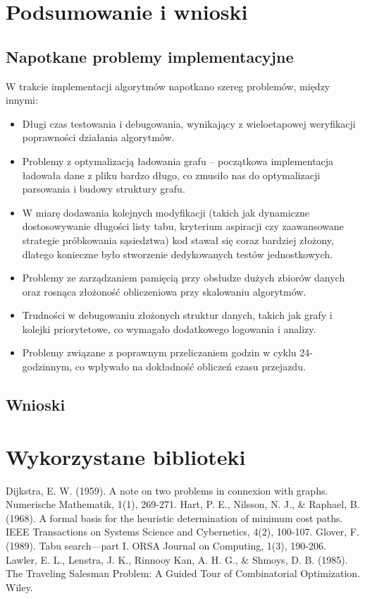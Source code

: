 \documentclass[12pt,a4paper]{article}
\begin{document}
\section{Podsumowanie i wnioski}

\subsection{Napotkane problemy implementacyjne}

W trakcie implementacji algorytmów napotkano szereg problemów, między innymi:
\begin{itemize}
    \item Długi czas testowania i debugowania, wynikający z wieloetapowej weryfikacji poprawności działania algorytmów.
    \item Problemy z optymalizacją ładowania grafu – początkowa implementacja ładowała dane z pliku bardzo długo, co zmusiło nas do optymalizacji parsowania i budowy struktury grafu.
    \item W miarę dodawania kolejnych modyfikacji (takich jak dynamiczne dostosowywanie długości listy tabu, kryterium aspiracji czy zaawansowane strategie próbkowania sąsiedztwa) kod stawał się coraz bardziej złożony, dlatego konieczne było stworzenie dedykowanych testów jednostkowych.
    \item Problemy ze zarządzaniem pamięcią przy obsłudze dużych zbiorów danych oraz rosnąca złożoność obliczeniowa przy skalowaniu algorytmów.
    \item Trudności w debugowaniu złożonych struktur danych, takich jak grafy i kolejki priorytetowe, co wymagało dodatkowego logowania i analizy.
    \item Problemy związane z poprawnym przeliczaniem godzin w cyklu 24-godzinnym, co wpływało na dokładność obliczeń czasu przejazdu.
\end{itemize}

\subsection{Wnioski}

\section{Wykorzystane biblioteki}

\begin{thebibliography}{9}
     Dijkstra, E. W. (1959). A note on two problems in connexion with graphs. Numerische Mathematik, 1(1), 269-271.
     Hart, P. E., Nilsson, N. J., & Raphael, B. (1968). A formal basis for the heuristic determination of minimum cost paths. IEEE Transactions on Systems Science and Cybernetics, 4(2), 100-107.
     Glover, F. (1989). Tabu search—part I. ORSA Journal on Computing, 1(3), 190-206.
     Lawler, E. L., Lenstra, J. K., Rinnooy Kan, A. H. G., & Shmoys, D. B. (1985). The Traveling Salesman Problem: A Guided Tour of Combinatorial Optimization. Wiley.
\end{thebibliography}
\end{document}
